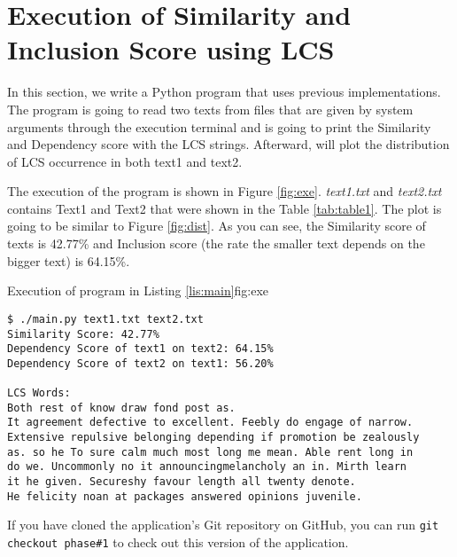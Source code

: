 \section{Execution of Similarity and Inclusion Score using LCS}

In this section, we write a Python program that uses previous 
implementations. The program is going to read two texts from 
files that are given by system arguments through the execution 
terminal and is going to print the Similarity and Dependency score 
with the LCS strings. Afterward, will plot the distribution of LCS 
occurrence in both text1 and text2. 


The execution of the program is shown in Figure \ref{fig:exe}. \textit{text1.txt}
and \textit{text2.txt} contains Text1 and Text2 that were shown in the
Table \ref{tab:table1}. The plot is going to be similar to Figure \ref{fig:dist}. As
you can see, the Similarity score of texts is 42.77\% and Inclusion score
(the rate the smaller text depends on the bigger text) is 64.15\%.

\begin{fig-shaded}{Execution of program in Listing \ref{lis:main}}{fig:exe}
\begin{lstlisting}[style=BASH]
$ ./main.py text1.txt text2.txt
Similarity Score: 42.77%  
Dependency Score of text1 on text2: 64.15%  
Dependency Score of text2 on text1: 56.20%

LCS Words:  
Both rest of know draw fond post as. 
It agreement defective to excellent. Feebly do engage of narrow. 
Extensive repulsive belonging depending if promotion be zealously 
as. so he To sure calm much most long me mean. Able rent long in 
do we. Uncommonly no it announcingmelancholy an in. Mirth learn 
it he given. Secureshy favour length all twenty denote. 
He felicity noan at packages answered opinions juvenile.
\end{lstlisting}
\end{fig-shaded}
If you have cloned the application’s Git repository on GitHub, you
can run \texttt{git checkout phase\#1} to check out this version of the application.

